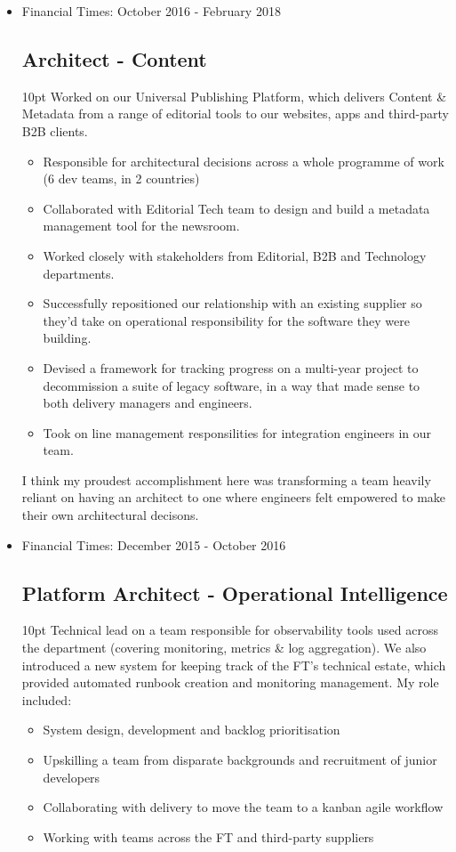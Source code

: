 \documentclass[a4paper]{article}
\newenvironment{detail}{\begin{adjustwidth}{10pt}{}}{\end{adjustwidth}}
\begin{document}
\begin{itemize}
\item Financial Times: October 2016 - February 2018
\subsection*{Architect - Content}
\begin{detail}
Worked on our Universal Publishing Platform, which delivers Content \& Metadata from a range of editorial tools to our websites, apps and third-party B2B clients.

\begin{itemize}
	\item Responsible for architectural decisions across a whole programme of work (6 dev teams, in 2 countries)
	\item Collaborated with Editorial Tech team to design and build a metadata management tool for the newsroom.
	\item Worked closely with stakeholders from Editorial, B2B and Technology departments.
	\item Successfully repositioned our relationship with an existing supplier so they'd take on operational responsibility for the software they were building.
	\item Devised a framework for tracking progress on a multi-year project to decommission a suite of legacy software, in a way that made sense to both delivery managers and engineers.
	\item Took on line management responsilities for integration engineers in our team.
\end{itemize}
I think my proudest accomplishment here was transforming a team heavily reliant on having an architect to one where engineers felt empowered to make their own architectural decisons.
\end{detail}

\item Financial Times: December 2015 - October 2016
\subsection*{Platform Architect - Operational Intelligence}
\begin{detail}
Technical lead on a team responsible for observability tools used across the department (covering monitoring, metrics \& log aggregation).  We also introduced a new system for keeping track of the FT's technical estate, which provided automated runbook creation and monitoring management.  My role included:
\begin{itemize}
	\item System design, development and backlog prioritisation
	\item Upskilling a team from disparate backgrounds and recruitment of junior developers
	\item Collaborating with delivery to move the team to a kanban agile workflow
	\item Working with teams across the FT and third-party suppliers
\end{itemize}
\end{detail}


\end{itemize}
\end{document}
